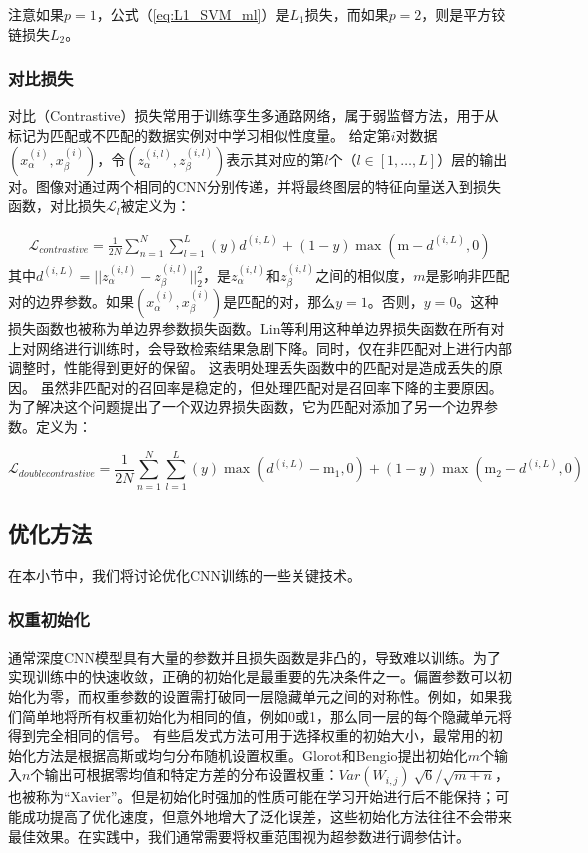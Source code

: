 注意如果$ p = 1 $，公式（\ref{eq:L1_SVM_ml}）是$ L_1 $损失，而如果$ p = 2 $，则是平方铰链损失$ L_2$。

\subsubsection{对比损失}
对比（Contrastive）损失\cite{Shaham2017Learning}常用于训练孪生多通路网络，属于弱监督方法，用于从标记为匹配或不匹配的数据实例对中学习相似性度量。 给定第$i$对数据$(x_{\alpha} ^{(i)},x_{\beta} ^{(i)})$，令$(z_{\alpha} ^{(i,l)},z_{\beta} ^{(i,l)})$表示其对应的第$l$个（$l \in [1,\dots,L]$）层的输出对。图像对通过两个相同的CNN分别传递，并将最终图层的特征向量送入到损失函数，对比损失$ \mathcal {L} _l $被定义为：

\begin{equation}
\begin{aligned}
\label{ContrastiveLoss}
 \mathcal{L}_{contrastive}= \frac{1}{2N}\sum_{n=1}^{N}\sum_{l=1}^{L}(y)d^{(i,L)} + (1-y)\max(\mathrm{m}-d^{(i,L)}, 0) 
\end{aligned}
\end{equation}
其中$d^{(i,L)} = ||z_{\alpha}^{(i,l)} - z_{\beta}^{(i,l)}||_2^2$，是$ z ^{(i,l)}_\alpha $和$ z^{(i,l)}_\beta $之间的相似度，$ m $是影响非匹配对的边界参数。如果$(x_{\alpha} ^{(i)},x_{\beta} ^{(i)})$是匹配的对，那么$ y = 1 $。否则，$ y = 0 $。这种损失函数也被称为单边界参数损失函数。Lin等\cite{Zhu2016b}利用这种单边界损失函数在所有对上对网络进行训练时，会导致检索结果急剧下降。同时，仅在非匹配对上进行内部调整时，性能得到更好的保留。 这表明处理丢失函数中的匹配对是造成丢失的原因。 虽然非匹配对的召回率是稳定的，但处理匹配对是召回率下降的主要原因。 为了解决这个问题提出了一个双边界损失函数，它为匹配对添加了另一个边界参数。定义为：

\begin{equation}
\label{DMContrastiveLoss}
\mathcal{L}_{doublecontrastive}= \frac{1}{2N}\sum_{n=1}^{N}\sum_{l=1}^{L}(y)\max(d^{(i,L)}-\mathrm{m}_1,0) + (1-y)\max(\mathrm{m}_2-d^{(i,L)}, 0)
\end{equation}
\subsection{优化方法}
在本小节中，我们将讨论优化CNN训练的一些关键技术。

\subsubsection{权重初始化}
通常深度CNN模型具有大量的参数并且损失函数是非凸的，导致难以训练。为了实现训练中的快速收敛，正确的初始化是最重要的先决条件之一。偏置参数可以初始化为零，而权重参数的设置需打破同一层隐藏单元之间的对称性。例如，如果我们简单地将所有权重初始化为相同的值，例如0或1，那么同一层的每个隐藏单元将得到完全相同的信号。
有些启发式方法可用于选择权重的初始大小，最常用的初始化方法是根据高斯或均匀分布随机设置权重。Glorot和Bengio\cite{Glorot2010}提出初始化$m$个输入$n$个输出可根据零均值和特定方差的分布设置权重：$ Var(W_{i,j})~ \sqrt{6} / \sqrt{m + n} $，也被称为“Xavier”。但是初始化时强加的性质可能在学习开始进行后不能保持；可能成功提高了优化速度，但意外地增大了泛化误差，这些初始化方法往往不会带来最佳效果。在实践中，我们通常需要将权重范围视为超参数进行调参估计。

